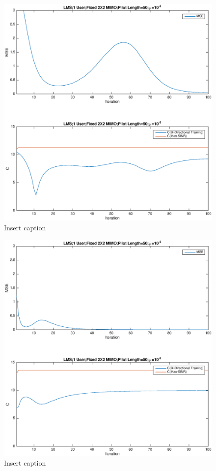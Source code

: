 \documentclass[11pt, oneside]{article}   	%
\begin{document}
\begin{figure}[bp!]
    \centering
    \centerline{\includegraphics[width=220mm]{LMS3}}
    \caption{Insert caption}
\end{figure} 

\begin{figure}[bp!]
    \centering
    \centerline{\includegraphics[width=220mm]{LMS4}}
    \caption{Insert caption}
\end{figure} 
\end{document}

